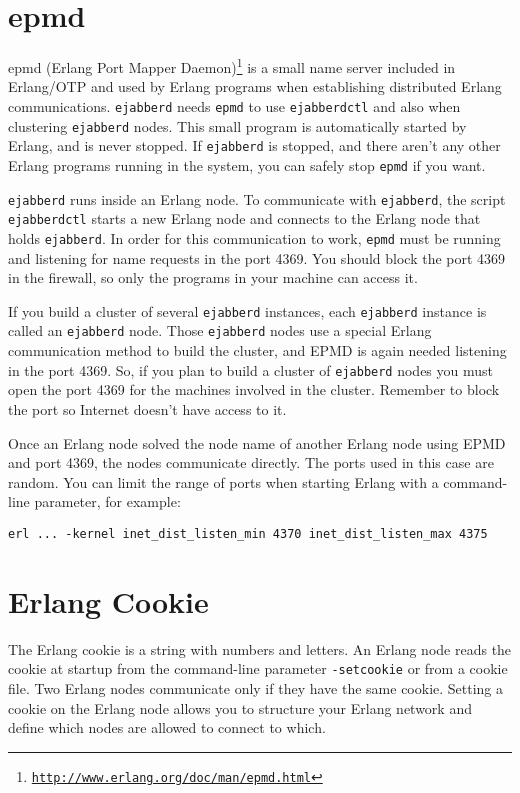 \documentclass[a4paper,10pt]{book}
\newcommand{\term}[1]{\texttt{#1}}
\newcommand{\ejabberd}{\texttt{ejabberd}}
\gdef\footahref#1#2{#2\footnote{\href{#1}{\texttt{#1}}}}
\begin{document}
\section{epmd }
\label{epmd}

\footahref{http://www.erlang.org/doc/man/epmd.html}{epmd (Erlang Port Mapper Daemon)}
is a small name server included in Erlang/OTP 
and used by Erlang programs when establishing distributed Erlang communications. 
\ejabberd{} needs \term{epmd} to use \term{ejabberdctl} and also when clustering \ejabberd{} nodes. 
This small program is automatically started by Erlang, and is never stopped.
If \ejabberd{} is stopped, and there aren't any other Erlang programs 
running in the system, you can safely stop \term{epmd} if you want.

\ejabberd{} runs inside an Erlang node. 
To communicate with \ejabberd{}, the script \term{ejabberdctl} starts a new Erlang node 
and connects to the Erlang node that holds \ejabberd{}.
In order for this communication to work,
\term{epmd} must be running and listening for name requests in the port 4369.
You should block the port 4369 in the firewall,
so only the programs in your machine can access it.

If you build a cluster of several \ejabberd{} instances,
each \ejabberd{} instance is called an \ejabberd{} node.
Those \ejabberd{} nodes use a special Erlang communication method to
build the cluster, and EPMD is again needed listening in the port 4369.
So, if you plan to build a cluster of \ejabberd{} nodes
you must open the port 4369 for the machines involved in the cluster.
Remember to block the port so Internet doesn't have access to it.

Once an Erlang node solved the node name of another Erlang node using EPMD and port 4369,
the nodes communicate directly.
The ports used in this case are random. 
You can limit the range of ports when starting Erlang with a command-line parameter, for example:
\begin{verbatim}
erl ... -kernel inet_dist_listen_min 4370 inet_dist_listen_max 4375
\end{verbatim}


\section{Erlang Cookie}
\label{cookie}

The Erlang cookie is a string with numbers and letters. 
An Erlang node reads the cookie at startup from the command-line parameter \term{-setcookie}
or from a cookie file.
Two Erlang nodes communicate only if they have the same cookie.
Setting a cookie on the Erlang node allows you to structure your Erlang network 
and define which nodes are allowed to connect to which.
\end{document}
